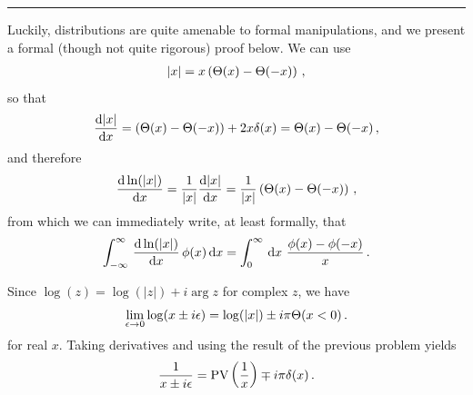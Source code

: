 


\vspace{10pt}
\hrule
\vspace{10pt}


Luckily, distributions are quite amenable to formal manipulations, and we present a formal (though not quite rigorous) proof below.
%
We can use
\begin{align}
    \abs{x}
    =
    x\left(\Theta(x)-\Theta(-x)\right)
    \,,
\end{align}
so that
\begin{align}
    \dv{\abs{x}}{x}
    =
    \left(\Theta(x)-\Theta(-x)\right)
    +
    2 x \delta(x)
    =
    \Theta(x)-\Theta(-x)
    \,,
\end{align}
and therefore
\begin{align}
    \dv{\ln(\abs{x})}{x}
    =
    \frac{1}{\abs{x}}\dv{\abs{x}}{x}
    =
    \frac{1}{\abs{x}}
    \left(
        \Theta(x)-\Theta(-x)
    \right)
    \,,
\end{align}
from which we can immediately write, at least formally, that
\begin{align}
    \int_{-\infty}^\infty
    \,
    \dv{\ln(\abs{x})}{x}
    \,
    \phi(x)
    \,
    \dd x
    =
    \int_0^\infty
    \,
    \dd x
    \,\,
    \frac{\phi(x) - \phi(-x)}{x}
    \,.
\end{align}





Since \(\log(z) = \log(|z|) + i \arg{z}\) for complex \(z\), we have
\begin{align}
    \lim_{\epsilon \to 0}
    \log(x \pm i \epsilon)
    =
    \log(\abs{x}) \pm i \pi \Theta(x < 0)
    \,.
\end{align}
for real \(x\).
%
Taking derivatives and using the result of the previous problem yields
\begin{align}
    \frac{1}{x \pm i \epsilon}
    =
    \text{PV}\left(\frac{1}{x}\right)
    \mp
    i\pi \delta(x)
    \,.
\end{align}




